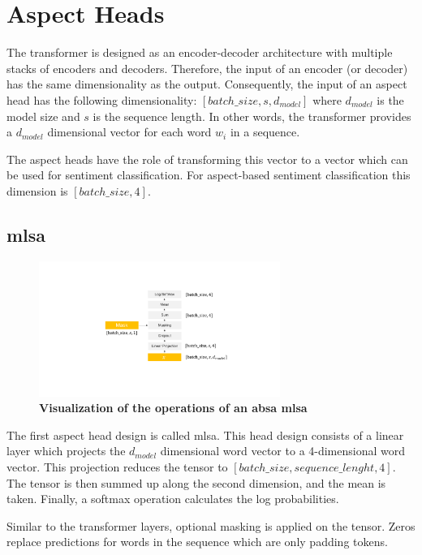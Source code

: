 \section{Aspect Heads}
\label{sec:04_aspectHeads}

The transformer is designed as an encoder-decoder architecture with multiple stacks of encoders and decoders. Therefore, the input of an encoder {(or decoder)} has the same dimensionality as the output. Consequently, the input of an aspect head has the following dimensionality: $[batch\_size, s, d_{model}]$ where $d_{model}$ is the model size and $s$ is the sequence length. In other words, the transformer provides a $d_{model}$ dimensional vector for each word $w_i$ in a sequence.
\medskip

The aspect heads have the role of transforming this vector to a vector which can be used for sentiment classification. For aspect-based sentiment classification this dimension is $[batch\_size, 4]$.

\subsection{\acrfull{mlsa}}

\begin{figure}[htp]
    \centering
    \includegraphics[width=0.7\textwidth]{figures/04_method/04_lmh}
    \caption{\textbf{Visualization of the operations of an \gls{absa} \acrfull{mlsa}}}
    \label{fig:04_lmh}
\end{figure}

The first aspect head design is called \acrfull{mlsa}. This head design consists of a linear layer which projects the $d_{model}$ dimensional word vector to a 4-dimensional word vector. This projection reduces the tensor to $[batch\_size, sequence\_lenght, 4]$. The tensor is then summed up along the second dimension, and the mean is taken. Finally, a softmax operation calculates the log probabilities.

Similar to the transformer layers, optional masking is applied on the tensor. Zeros replace predictions for words in the sequence which are only padding tokens.

